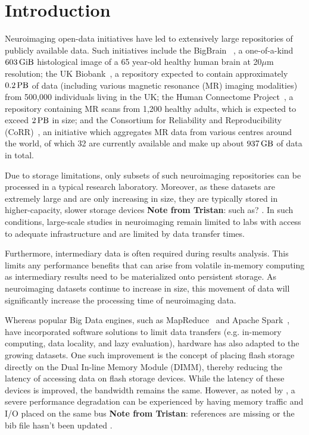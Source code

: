 \documentclass[conference]{IEEEtran}
\newcommand{\bigbrain}{BigBrain }
\newcommand{\tristan}[1]{\color{orange}\textbf{Note from Tristan}:
      #1 \color{black}}
\begin{document}
\section{Introduction}
Neuroimaging open-data initiatives have led to extensively large repositories of
publicly available data. Such initiatives include the \bigbrain~\cite{BigBrain}, 
a one-of-a-kind $\SI{603}{\gibi\byte}$
histological image of a 65 year-old healthy human brain
at 20$\mu$m resolution; the UK Biobank~\cite{ukbiobank}, a repository expected to
contain approximately $\SI{0.2}{\peta\byte}$ of data (including various magnetic
resonance (MR) imaging modalities) from 500,000 individuals living in the UK;
the Human Connectome Project~\cite{HCP}, a repository containing MR scans from
1,200 healthy adults, which is expected to exceed $\SI{2}{\peta\byte}$ in size; 
and the Consortium for Reliability and Reproducibility (CoRR)~\cite{corr}, an
initiative which aggregates MR data from various centres around the world, 
of which 32 are currently available and make up about $\SI{937}{\giga\byte}$ of
data in total.

Due to storage limitations, only subsets of such neuroimaging repositories 
can be processed in a typical research laboratory. Moreover, as these datasets 
are extremely large and are only increasing in size, they are typically stored 
in higher-capacity, slower storage devices \tristan{such as?}. In such conditions, large-scale 
studies in neuroimaging remain limited to labs with access to adequate 
infrastructure and are limited by data transfer times.

Furthermore, intermediary data is often required during results analysis. This limits
any performance benefits that can arise from volatile in-memory computing as intermediary
results need to be materialized onto persistent storage. As neuroimaging datasets continue
to increase in size, this movement of data will significantly increase the processing time
of neuroimaging data.

Whereas popular Big Data engines, such as MapReduce~\cite{mapreduce} and Apache Spark~\cite{spark}, have
incorporated software solutions to limit data transfers (e.g. in-memory computing,
data locality, and lazy evaluation), hardware has also adapted to the growing datasets.
One such improvement is the concept of placing flash storage directly on the Dual
In-line Memory Module (DIMM), thereby reducing the latency of accessing data on 
flash storage devices. While the latency of these devices is improved, the bandwidth
remains the same. However, as noted by \cite{nvdimms}, a severe performance degradation
can be experienced by having memory traffic and I/O placed on the same bus \tristan{references are
missing or the bib file hasn't been updated}.
\end{document}

